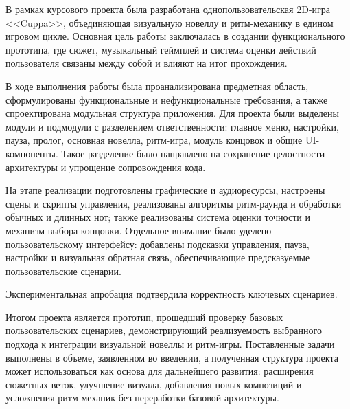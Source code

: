 \documentclass[utf8, russian]{eskdtext}
\numberwithin{equation}{section}
\begin{document}
В рамках курсового проекта была разработана однопользовательская 2D-игра <<Cuppa>>, объединяющая визуальную новеллу и ритм-механику в едином игровом цикле. Основная цель работы заключалась в создании функционального прототипа, где сюжет, музыкальный геймплей и система оценки действий пользователя связаны между собой и влияют на итог прохождения.

В ходе выполнения работы была проанализирована предметная область, сформулированы функциональные и нефункциональные требования, а также спроектирована модульная структура приложения. Для проекта были выделены модули и подмодули с разделением ответственности: главное меню, настройки, пауза, пролог, основная новелла, ритм-игра, модуль концовок и общие UI-компоненты. Такое разделение было направлено на сохранение целостности архитектуры и упрощение сопровождения кода.

На этапе реализации подготовлены графические и аудиоресурсы, настроены сцены и скрипты управления, реализованы алгоритмы ритм-раунда и обработки обычных и длинных нот; также реализованы система оценки точности и механизм выбора концовки. Отдельное внимание было уделено пользовательскому интерфейсу: добавлены подсказки управления, пауза, настройки и визуальная обратная связь, обеспечивающие предсказуемые пользовательские сценарии.

Экспериментальная апробация подтвердила корректность ключевых сценариев.

Итогом проекта является прототип, прошедший проверку базовых пользовательских сценариев, демонстрирующий реализуемость выбранного подхода к интеграции визуальной новеллы и ритм-игры. Поставленные задачи выполнены в объеме, заявленном во введении, а полученная структура проекта может использоваться как основа для дальнейшего развития: расширения сюжетных веток, улучшение визуала, добавления новых композиций и усложнения ритм-механик без переработки базовой архитектуры.
\end{document}
